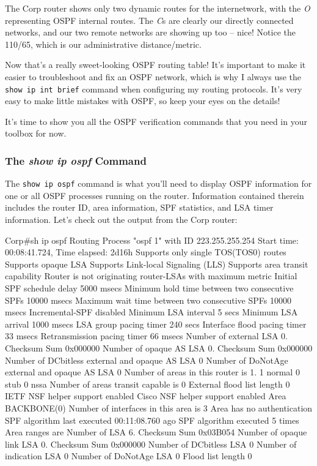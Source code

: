 \protect\hypertarget{c18.xhtmlux5cux23Page_766}{}{}The Corp router shows
only two dynamic routes for the internetwork, with the \emph{O}
representing OSPF internal routes. The \emph{C}s are clearly our
directly connected networks, and our two remote networks are showing up
too -- nice! Notice the 110/65, which is our administrative
distance/metric.

Now that's a really sweet-looking OSPF routing table! It's important to
make it easier to troubleshoot and fix an OSPF network, which is why I
always use the \texttt{show\ ip\ int\ brief} command when configuring my
routing protocols. It's very easy to make little mistakes with OSPF, so
keep your eyes on the details!

It's time to show you all the OSPF verification commands that you need
in your toolbox for now.

\subsubsection[The \emph{show ip ospf}
Command]{\texorpdfstring{\protect\hypertarget{c18.xhtmlux5cux23c18-sec-12}{}{}The
\emph{show ip ospf} Command}{The show ip ospf Command}}

The \texttt{show\ ip\ ospf} command is what you'll need to display OSPF
information for one or all OSPF processes running on the router.
Information contained therein includes the router ID, area information,
SPF statistics, and LSA timer information. Let's check out the output
from the Corp router:

\begin{cli}
Corp#sh ip ospf
 Routing Process "ospf 1" with ID 223.255.255.254
 Start time: 00:08:41.724, Time elapsed: 2d16h
 Supports only single TOS(TOS0) routes
 Supports opaque LSA
 Supports Link-local Signaling (LLS)
 Supports area transit capability
 Router is not originating router-LSAs with maximum metric
 Initial SPF schedule delay 5000 msecs
 Minimum hold time between two consecutive SPFs 10000 msecs
 Maximum wait time between two consecutive SPFs 10000 msecs
 Incremental-SPF disabled
 Minimum LSA interval 5 secs
 Minimum LSA arrival 1000 msecs
 LSA group pacing timer 240 secs
 Interface flood pacing timer 33 msecs
 Retransmission pacing timer 66 msecs
 Number of external LSA 0. Checksum Sum 0x000000
 Number of opaque AS LSA 0. Checksum Sum 0x000000
 Number of DCbitless external and opaque AS LSA 0
 Number of DoNotAge external and opaque AS LSA 0
 Number of areas in this router is 1. 1 normal 0 stub 0 nssa
 Number of areas transit capable is 0
 External flood list length 0
 IETF NSF helper support enabled
 Cisco NSF helper support enabled
    Area BACKBONE(0)
        Number of interfaces in this area is 3
        Area has no authentication
        SPF algorithm last executed 00:11:08.760 ago
        SPF algorithm executed 5 times
        Area ranges are
        Number of LSA 6. Checksum Sum 0x03B054
        Number of opaque link LSA 0. Checksum Sum 0x000000
        Number of DCbitless LSA 0
        Number of indication LSA 0
        Number of DoNotAge LSA 0
        Flood list length 0
\end{cli}

